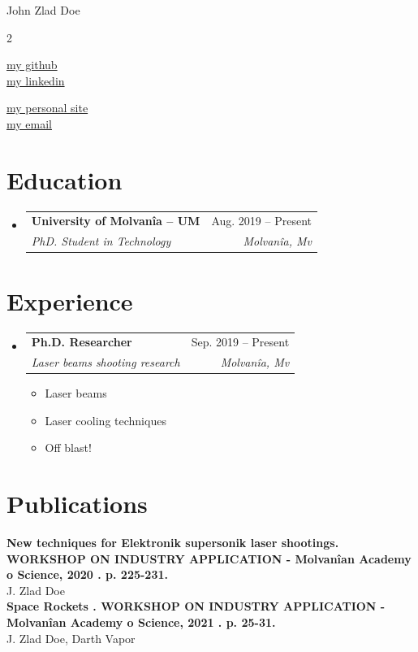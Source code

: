 \documentclass[letterpaper,10pt]{article}
\makeatletter
\newcommand{\resumeItem}[1]{
  \item\small{
    {#1 \vspace{-2pt}}
  }
}
\newcommand{\resumeSubheading}[4]{
  \vspace{-2pt}\item
    \begin{tabular*}{0.97\textwidth}[t]{l@{\extracolsep{\fill}}r}
      \textbf{#1} & #2 \\
      \textit{\small#3} & \textit{\small #4} \\
    \end{tabular*}\vspace{-7pt}
}
\newcommand{\resumeSubHeadingListStart}{\begin{itemize}[leftmargin=0.15in, label={}]}
\newcommand{\resumeSubHeadingListEnd}{\end{itemize}}
\newcommand{\resumeItemListStart}{\begin{itemize}}
\newcommand{\resumeItemListEnd}{\end{itemize}\vspace{-5pt}}
\makeatother
\begin{document}
\begin{center}
    {\LARGE John Zlad Doe} \\ \vspace{2pt}
    \begin{multicols}{2}
    \begin{flushleft}
    \href{{your github page link}}{my github}\\
    \href{{your linkedin page link}}{my linkedin}
    \end{flushleft}

    \begin{flushright}
    \href{{your personal websit link}}{my personal site}\\
    \href{mailto:{your email adress}}{my email}
    \end{flushright}
    \end{multicols}
\end{center}


\vspace{-2pt}
\section{Education}
  \resumeSubHeadingListStart
      \resumeSubheading
      {University of Molvanîa -- UM}{Aug. 2019 -- Present}
      {PhD. Student in Technology}{Molvanîa, Mv}

  \resumeSubHeadingListEnd


\section{Experience}
  \resumeSubHeadingListStart
    \resumeSubheading
      {Ph.D. Researcher}{Sep. 2019 -- Present}
      {Laser beams shooting research}{Molvanîa, Mv}
      \resumeItemListStart
        \resumeItem{Laser beams}
        \resumeItem{Laser cooling techniques}
        \resumeItem{Off blast!}
    \resumeItemListEnd

  \resumeSubHeadingListEnd

\section{Publications}
 \begin{itemize}[leftmargin=0.15in, label={}]
    \small{\item{
    \textbf{New techniques for Elektronik supersonik laser shootings. WORKSHOP ON INDUSTRY APPLICATION - Molvanîan Academy o Science, 2020 . p. 225-231.}{\\J. Zlad Doe}\\
        \textbf{Space Rockets . WORKSHOP ON INDUSTRY APPLICATION - Molvanîan Academy o Science, 2021 . p. 25-31.}{\\J. Zlad Doe, Darth Vapor}\\
\
}}
 \end{itemize}
\end{document}
